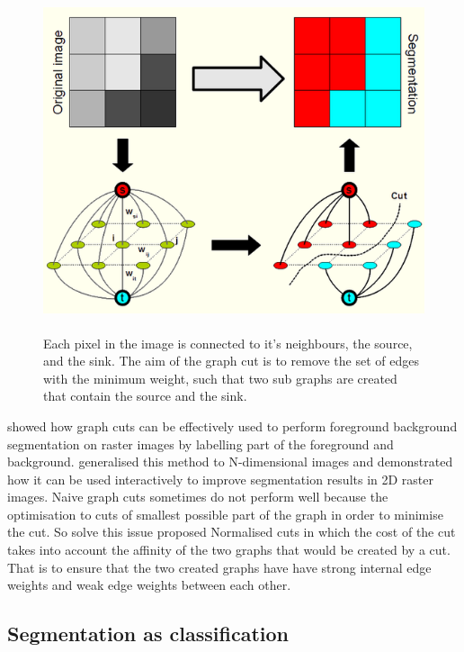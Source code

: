 \begin{figure}
\centering
\includegraphics[height=10cm]{images/graphcut}
\caption[Graph cut]{Each pixel in the image is connected to it's neighbours, the source, and the sink. The aim of the graph cut is to remove the set of edges with the minimum weight, such that two sub graphs are created that contain the source and the sink. \protect\footnotemark}\label{fig:graphcut}
\end{figure}



\citet{Boykov2001b} showed how graph cuts can be effectively used to perform foreground background segmentation on raster images by labelling part of the foreground and background. \citet{Boykov2001a} generalised this method to N-dimensional images and demonstrated how it can be used interactively to improve segmentation results in 2D raster images. Naive graph cuts sometimes do not perform well because the optimisation to cuts of smallest possible part of the graph in order to minimise the cut. So solve this issue \citet{Malik2000} proposed Normalised cuts in which the cost of the cut takes into account the affinity of the two graphs that would be created by a cut. That is to ensure that the two created graphs have have strong internal edge weights and weak edge weights between each other.



\subsection{Segmentation as classification}

